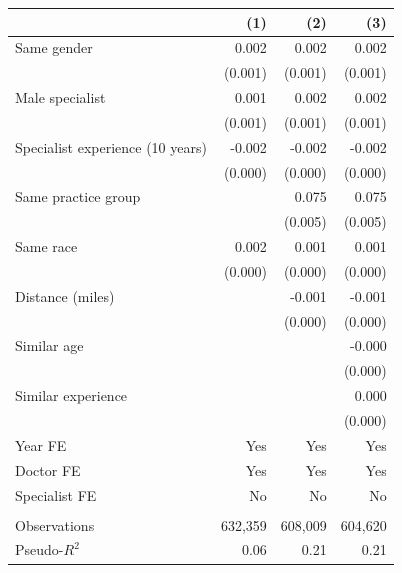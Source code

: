 
\begin{tabular}{lrrr}
\toprule
  & (1) & (2) & (3)\\
\midrule
Same gender & 0.002 & 0.002 & 0.002\\
 & (0.001) & (0.001) & \vphantom{1} (0.001)\\
Male specialist & 0.001 & 0.002 & 0.002\\
 & (0.001) & (0.001) & (0.001)\\
Specialist experience (10 years) & -0.002 & -0.002 & -0.002\\
 & (0.000) & (0.000) & \vphantom{1} (0.000)\\
Same practice group &  & 0.075 & 0.075\\
 &  & (0.005) & (0.005)\\
Same race & 0.002 & 0.001 & 0.001\\
 & (0.000) & (0.000) & (0.000)\\
Distance (miles) &  & -0.001 & -0.001\\
 &  & (0.000) & (0.000)\\
Similar age &  &  & -0.000\\
 &  &  & \vphantom{1} (0.000)\\
Similar experience &  &  & 0.000\\
 &  &  & (0.000)\\
\midrule
Year FE & Yes & Yes & Yes\\
Doctor FE & Yes & Yes & Yes\\
Specialist FE & No & No & No\\
\midrule\\
Observations & 632,359 & 608,009 & 604,620\\
Pseudo-$R^2$ & 0.06 & 0.21 & 0.21\\
\bottomrule
\end{tabular}
